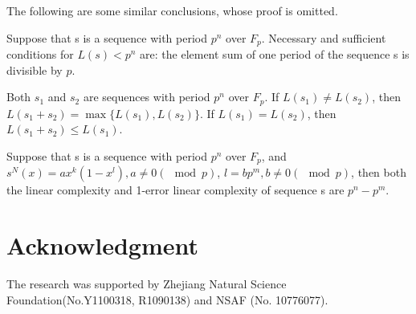 \documentclass[10pt,conference,twocolumn]{IEEEtran}
\begin{document}
The following are some similar conclusions, whose proof is omitted.

   Suppose that s is a sequence with
period $p^n$ over $F_p$. Necessary and sufficient conditions for
$L(s)< p^n$ are: the element sum of one period of the sequence s is
divisible by $p$.

 Both $s_1$ and $s_2$ are sequences with
period $p^n$ over $F_p$.  If  $L(s_1)\ne L(s_2)$, then
$L(s_1+s_2)=\max\{L(s_1),L(s_2)\}$. If $L(s_1)=L(s_2)$, then
$L(s_1+s_2)\le L(s_1)$.

   Suppose that s is a sequence with
period $p^n$ over $F_p$, and  $s^N(x)=ax^k(1-x^l), a\ne0(\mod p)$,
$l=bp^m, b\ne0(\mod p)$, then both the linear complexity and 1-error
linear complexity of sequence s are $p^n-p^m$.




 \section*{ Acknowledgment}
 The research was supported by
Zhejiang Natural Science Foundation(No.Y1100318, R1090138) and NSAF
(No. 10776077).
\end{document}
